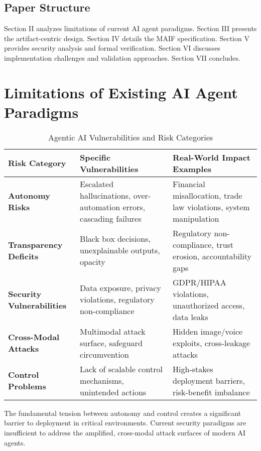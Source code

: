 \documentclass[conference]{IEEEtran}
\begin{document}
\subsection{Paper Structure}

Section II analyzes limitations of current AI agent paradigms. Section III presents the artifact-centric design. Section IV details the MAIF specification. Section V provides security analysis and formal verification. Section VI discusses implementation challenges and validation approaches. Section VII concludes.

\section{Limitations of Existing AI Agent Paradigms}
\label{sec:limitations}

\begin{table*}[!t]
\renewcommand{\arraystretch}{1.3}
\caption{Agentic AI Vulnerabilities and Risk Categories}
\label{tab:agentic-vulnerabilities}
\centering
\footnotesize
\begin{tabular}{p{3cm}p{5cm}p{6cm}}
\toprule
\textbf{Risk Category} & \textbf{Specific Vulnerabilities} & \textbf{Real-World Impact Examples} \\
\midrule
\textbf{Autonomy Risks} & Escalated hallucinations, over-automation errors, cascading failures & Financial misallocation, trade law violations, system manipulation \\
\textbf{Transparency Deficits} & Black box decisions, unexplainable outputs, opacity & Regulatory non-compliance, trust erosion, accountability gaps \\
\textbf{Security Vulnerabilities} & Data exposure, privacy violations, regulatory non-compliance & GDPR/HIPAA violations, unauthorized access, data leaks \\
\textbf{Cross-Modal Attacks} & Multimodal attack surface, safeguard circumvention & Hidden image/voice exploits, cross-leakage attacks \\
\textbf{Control Problems} & Lack of scalable control mechanisms, unintended actions & High-stakes deployment barriers, risk-benefit imbalance \\
\bottomrule
\end{tabular}
\end{table*}

The fundamental tension between autonomy and control creates a significant barrier to deployment in critical environments. Current security paradigms are insufficient to address the amplified, cross-modal attack surfaces of modern AI agents.
\end{document}
